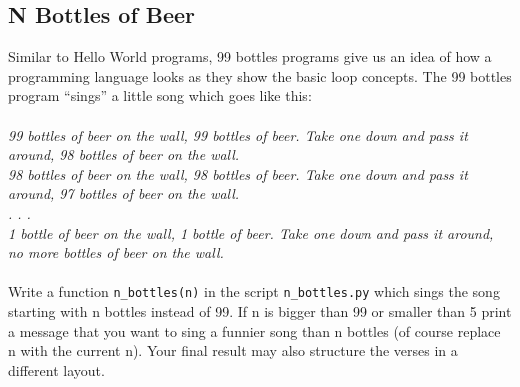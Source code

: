 \subsection{N Bottles of Beer}
Similar to Hello World programs, 99 bottles programs give us an idea of how
a programming language looks as they show the basic loop concepts.
The 99 bottles program “sings” a little song which goes like this:\\\\
\textit{
99 bottles of beer on the wall, 99 bottles of beer. Take one down and
pass it around, 98 bottles of beer on the wall.\\
98 bottles of beer on the wall, 98 bottles of beer. Take one down and
pass it around, 97 bottles of beer on the wall.\\
. . .\\
1 bottle of beer on the wall, 1 bottle of beer. Take one down and
pass it around, no more bottles of beer on the wall.\\\\
}
Write a function \texttt{n\_bottles(n)} in the script \texttt{n\_bottles.py} which
sings the song starting with n bottles instead of 99. If n is bigger than 99 or
smaller than 5 print a message that you want to sing a funnier song than n bottles
(of course replace n with the current n). Your final result may also structure
the verses in a different layout.

\cprotect{}


\subsection{}


